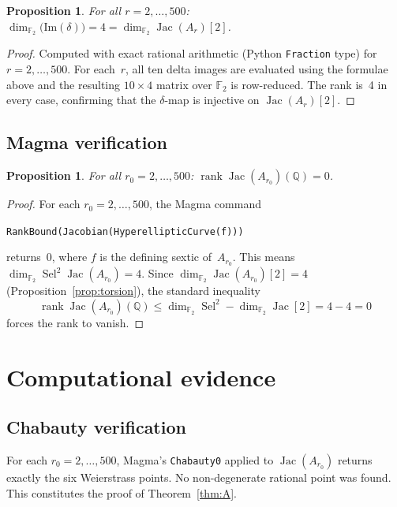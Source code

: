 \documentclass[11pt]{amsart}
\theoremstyle{plain}
\newtheorem{proposition}[theorem]{Proposition}
\theoremstyle{definition}
\theoremstyle{remark}
\newcommand{\QQ}{\mathbb{Q}}
\newcommand{\FF}{\mathbb{F}}
\newcommand{\Jac}{\operatorname{Jac}}
\newcommand{\rank}{\operatorname{rank}}
\newcommand{\Sel}{\operatorname{Sel}}
\begin{document}
\begin{proposition}\label{prop:delta-rank}
For all $r=2,\dots,500$:
$\dim_{\FF_2}\bigl(\mathrm{Im}(\delta)\bigr)=4 = \dim_{\FF_2}\Jac(A_r)[2]$.
\end{proposition}

\begin{proof}
Computed with exact rational arithmetic (Python \texttt{Fraction} type) for
$r=2,\dots,500$.  For each~$r$, all ten delta images are evaluated using the
formulae above and the resulting $10\times 4$ matrix over $\FF_2$ is row-reduced.
The rank is~4 in every case, confirming that the $\delta$-map is injective on
$\Jac(A_r)[2]$.
\end{proof}

\subsection{Magma verification}

\begin{proposition}\label{prop:rank-zero}
For all $r_0=2,\dots,500$: $\rank\Jac(A_{r_0})(\QQ)=0$.
\end{proposition}

\begin{proof}
For each $r_0=2,\dots,500$, the Magma command
\begin{center}
\texttt{RankBound(Jacobian(HyperellipticCurve(f)))}
\end{center}
returns~$0$, where $f$ is the defining sextic of~$A_{r_0}$.
This means $\dim_{\FF_2}\Sel^2\Jac(A_{r_0})=4$.
Since $\dim_{\FF_2}\Jac(A_{r_0})[2]=4$ (Proposition~\ref{prop:torsion}),
the standard inequality
\[
  \rank\Jac(A_{r_0})(\QQ) \le \dim_{\FF_2}\Sel^2 - \dim_{\FF_2}\Jac[2] = 4-4 = 0
\]
forces the rank to vanish.
\end{proof}


\section{Computational evidence}\label{sec:computation}

\subsection{Chabauty verification}

For each $r_0=2,\dots,500$, Magma's \texttt{Chabauty0} applied to $\Jac(A_{r_0})$
returns exactly the six Weierstrass points.  No non-degenerate rational point
was found.  This constitutes the proof of Theorem~\ref{thm:A}.
\end{document}

